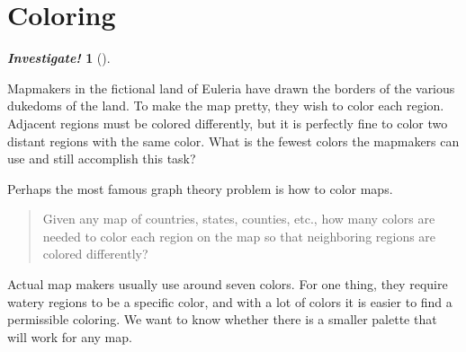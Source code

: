 \documentclass[10pt,]{book}
\theoremstyle{plain}
\theoremstyle{definition}
\theoremstyle{definition}
\newtheorem{investigation}[project]{\emph{Investigate!}}
\theoremstyle{definition}
\numberwithin{equation}{chapter}
\begin{document}
\section[Coloring]{Coloring}\label{sec_coloring}
\typeout{************************************************}
\typeout{************************************************}
\begin{investigation}[]\label{investigation-33}

Mapmakers in the fictional land of Euleria have drawn the borders of the various dukedoms of the land. To make the map pretty, they wish to color each region. Adjacent regions must be colored differently, but it is perfectly fine to color two distant regions with the same color. What is the fewest colors the mapmakers can use and still accomplish this task?
%
\leavevmode%
\begin{figure}
\centering
{
}
\end{figure}
\end{investigation}

Perhaps the most famous graph theory problem is how to color maps.
%
\begin{quote}
Given any map of countries, states, counties, etc., how many colors are needed to color each region on the map so that neighboring regions are colored differently?
\end{quote}
\par

Actual map makers usually use around seven colors. For one thing, they require watery regions to be a specific color, and with a lot of colors it is easier to find a permissible coloring. We want to know whether there is a smaller palette that will work for any map.
%
\par
\end{document}

